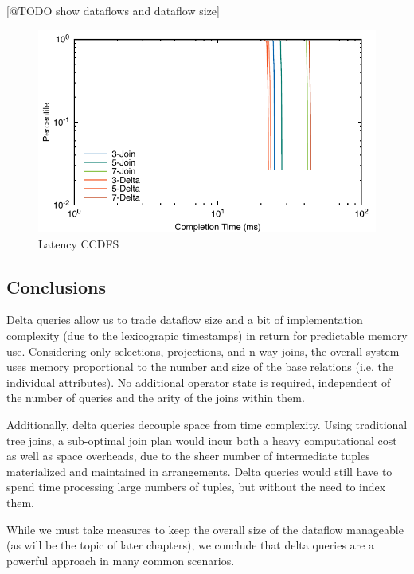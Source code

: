 \documentclass[../catalog.tex]{subfiles}
\begin{document}
[@TODO show dataflows and dataflow size]

\begin{figure}[h!]
  \includegraphics[width=1.0\linewidth]{results/join-state/out/all_cdfs}
  \caption{Latency CCDFS}
  \label{fig:arity-latencies}
\end{figure}

\subsection{Conclusions}

Delta queries allow us to trade dataflow size and a bit of
implementation complexity (due to the lexicograpic timestamps) in
return for predictable memory use. Considering only selections,
projections, and n-way joins, the overall system uses memory
proportional to the number and size of the base relations (i.e. the
individual attributes). No additional operator state is required,
independent of the number of queries and the arity of the joins within
them.

Additionally, delta queries decouple space from time complexity. Using
traditional tree joins, a sub-optimal join plan would incur both a
heavy computational cost as well as space overheads, due to the sheer
number of intermediate tuples materialized and maintained in
arrangements. Delta queries would still have to spend time processing
large numbers of tuples, but without the need to index them.

While we must take measures to keep the overall size of the dataflow
manageable (as will be the topic of later chapters), we conclude that
delta queries are a powerful approach in many common scenarios.
\end{document}
